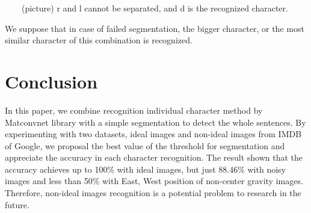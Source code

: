 \documentclass[10pt,twocolumn,letterpaper]{article}
\begin{document}
~~~~(picture) r and l cannot be separated, and d is the recognized character.

We suppose that in case of failed segmentation, the bigger character, or the most similar character of this combination is recognized.

\section{Conclusion}

In this paper, we combine recognition individual character method by Matconvnet library with a simple segmentation to detect the whole sentences. By experimenting with two datasets, ideal images and non-ideal images from IMDB of Google, we proposal the best value of the threshold for segmentation and appreciate the accuracy in each character recognition. The result shown that the accuracy achieves up to 100\% with ideal images, but just 88.46\% with noisy images and less than 50\% with East, West position of non-center gravity images. Therefore, non-ideal images recognition is a potential problem to research in the future.


{\small


}
\end{document}
